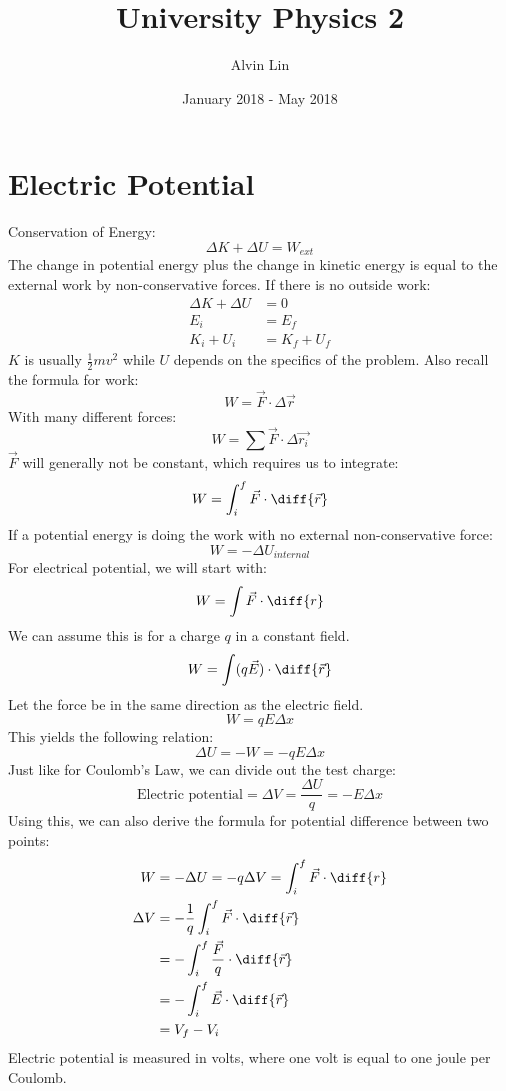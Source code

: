 \documentclass{math}
\title{University Physics 2}
\author{Alvin Lin}
\date{January 2018 - May 2018}
\begin{document}
\maketitle

\section*{Electric Potential}
Conservation of Energy:
\[ \Delta K+\Delta U = W_{ext} \]
The change in potential energy plus the change in kinetic energy is equal to
the external work by non-conservative forces. If there is no outside work:
\begin{align*}
  \Delta K+\Delta U &= 0 \\
  E_i &= E_f \\
  K_i+U_i &= K_f+U_f
\end{align*}
\( K \) is usually \( \frac{1}{2}mv^2 \) while \( U \) depends on the specifics
of the problem. Also recall the formula for work:
\[ W = \vec{F}\cdot\Delta\vec{r} \]
With many different forces:
\[ W = \sum\vec{F}\cdot\Delta\vec{r_i} \]
\( \vec{F} \) will generally not be constant, which requires us to integrate:
\[ W = \int_{i}^{f}\vec{F}\cdot\diff{\vec{r}} \]
If a potential energy is doing the work with no external non-conservative force:
\[ W = -\Delta U_{internal} \]
For electrical potential, we will start with:
\[ W = \int\vec{F}\cdot\diff{r} \]
We can assume this is for a charge \( q \) in a constant field.
\[ W = \int(q\vec{E})\cdot\diff{\vec{r}} \]
Let the force be in the same direction as the electric field.
\[ W = qE\Delta x \]
This yields the following relation:
\[ \Delta U = -W = -qE\Delta x \]
Just like for Coulomb's Law, we can divide out the test charge:
\[ \text{Electric potential} = \Delta V = \frac{\Delta U}{q} = -E\Delta x \]
Using this, we can also derive the formula for potential difference between two
points:
\begin{align*}
  W &= -\Delta U = -q\Delta V = \int_{i}^{f}\vec{F}\cdot\diff{r} \\
  \Delta V &= -\frac{1}{q}\int_{i}^{f}\vec{F}\cdot\diff{\vec{r}} \\
  &= -\int_{i}^{f}\frac{\vec{F}}{q}\cdot\diff{\vec{r}} \\
  &= -\int_{i}^{f}\vec{E}\cdot\diff{\vec{r}} \\
  &= V_f-V_i
\end{align*}
Electric potential is measured in volts, where one volt is equal to one joule
per Coulomb.
\end{document}
